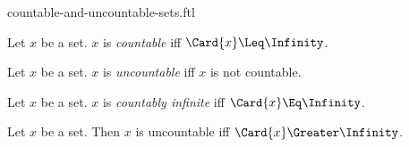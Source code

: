 \documentclass{stex}
\begin{document}
\begin{smodule}{countable-and-uncountable-sets.ftl}



\begin{definition*}[forthel,for=countable]
  Let $x$ be a set.
  $x$ is \emph{countable} iff $\Card{x} \Leq \Infinity$.
\end{definition*}

\begin{definition*}[forthel,for=uncountable]
  Let $x$ be a set.
  $x$ is \emph{uncountable} iff $x$ is not countable.
\end{definition*}

\begin{definition*}[forthel,for=countably infinite]
  Let $x$ be a set.
  $x$ is \emph{countably infinite} iff $\Card{x} \Eq \Infinity$.
\end{definition*}

\begin{proposition*}[forthel]
  Let $x$ be a set.
  Then $x$ is uncountable iff $\Card{x} \Greater \Infinity$.
\end{proposition*}

\end{smodule}
\end{document}
